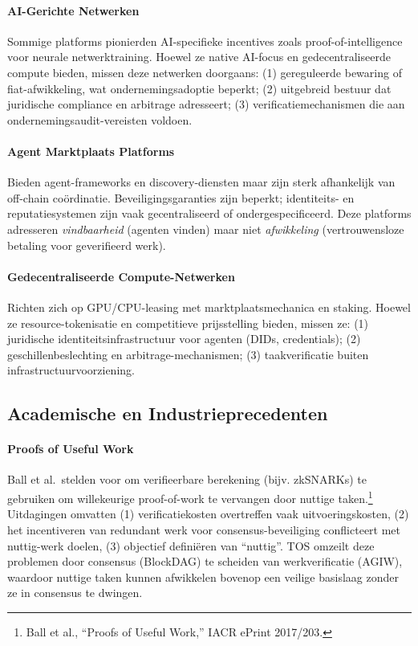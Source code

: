 \documentclass[11pt]{article}
\begin{document}
\paragraph{AI-Gerichte Netwerken} Sommige platforms pionierden AI-specifieke incentives zoals proof-of-intelligence voor neurale netwerktraining. Hoewel ze native AI-focus en gedecentraliseerde compute bieden, missen deze netwerken doorgaans: (1) gereguleerde bewaring of fiat-afwikkeling, wat ondernemingsadoptie beperkt; (2) uitgebreid bestuur dat juridische compliance en arbitrage adresseert; (3) verificatiemechanismen die aan ondernemingsaudit-vereisten voldoen.

\paragraph{Agent Marktplaats Platforms} Bieden agent-frameworks en discovery-diensten maar zijn sterk afhankelijk van off-chain coördinatie. Beveiligingsgaranties zijn beperkt; identiteits- en reputatiesystemen zijn vaak gecentraliseerd of ondergespecificeerd. Deze platforms adresseren \emph{vindbaarheid} (agenten vinden) maar niet \emph{afwikkeling} (vertrouwensloze betaling voor geverifieerd werk).

\paragraph{Gedecentraliseerde Compute-Netwerken} Richten zich op GPU/CPU-leasing met marktplaatsmechanica en staking. Hoewel ze resource-tokenisatie en competitieve prijsstelling bieden, missen ze: (1) juridische identiteitsinfrastructuur voor agenten (DIDs, credentials); (2) geschillenbeslechting en arbitrage-mechanismen; (3) taakverificatie buiten infrastructuurvoorziening.

\subsection{Academische en Industrieprecedenten}
\paragraph{Proofs of Useful Work} Ball et al.\ stelden voor om verifieerbare berekening (bijv. zkSNARKs) te gebruiken om willekeurige proof-of-work te vervangen door nuttige taken.\footnote{Ball et al., ``Proofs of Useful Work,'' IACR ePrint 2017/203.} Uitdagingen omvatten (1) verificatiekosten overtreffen vaak uitvoeringskosten, (2) het incentiveren van redundant werk voor consensus-beveiliging conflicteert met nuttig-werk doelen, (3) objectief definiëren van ``nuttig''. TOS omzeilt deze problemen door consensus (BlockDAG) te scheiden van werkverificatie (AGIW), waardoor nuttige taken kunnen afwikkelen bovenop een veilige basislaag zonder ze in consensus te dwingen.
\end{document}
